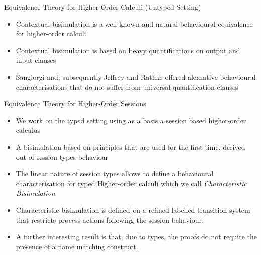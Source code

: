 \documentclass{beamer}
\begin{document}
	\begin{frame}{Equivalence Theory for Higher-Order Calculi (Untyped Setting)}
		\begin{itemize}
			\item	Contextual bisimulation is a well known and natural behavioural equivalence for higher-order calculi

			\item	Contextual bisimulation is based on heavy quantifications on output and input clauses

			\item	Sangiorgi and, subsequently Jeffrey and Rathke offered alernative behavioural characterisations
				that do not suffer from universal quantification clauses
		\end{itemize}
	\end{frame}

	\begin{frame}{Equivalence Theory for Higher-Order Sessions}
		\begin{itemize}
			\item	We work on the typed setting using as a basis a session based higher-order calculus

			\item	A bisimulation based on principles that are
				used for the first time, derived out of session types behaviour

			\item	The linear nature of session types allows to define
				a behavioural characterisation for typed Higher-order calculi
				which we call {\em Characteristic Bisimulation}

			\item	Characteristic bisimulation is defined on a refined labelled transition system
				that restricts process actions following the session behaviour.

			\item	A further interesting result is that, due to types, the proofs do
				not require the presence of a name matching construct.
		\end{itemize}
	\end{frame}
\end{document}
